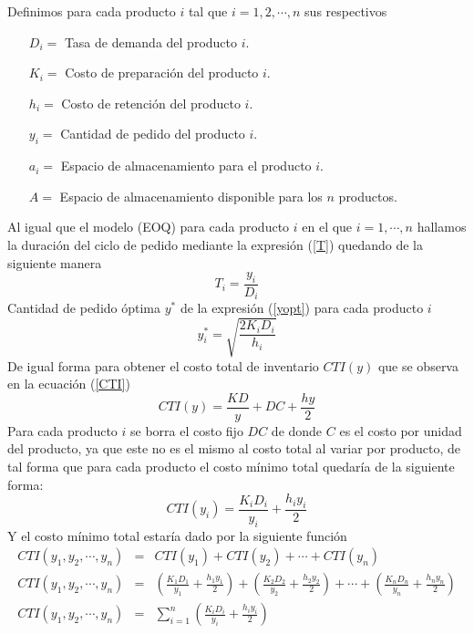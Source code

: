 Definimos para cada producto $i$ tal que $i = 1, 2, \cdots , n$ sus respectivos
\begin{itemize}
	\item[$D_i=$] Tasa de demanda del producto $i$.
	\item[$K_i=$] Costo de preparación del producto $i$.
	\item[$h_i=$] Costo de retención del producto $i$.
	\item[$y_i=$] Cantidad de pedido del producto $i$.
	\item[$a_i=$] Espacio de almacenamiento para el producto $i$.
	\item[$A=$] Espacio de almacenamiento disponible para los $n$ productos.
\end{itemize}
Al igual que el modelo (EOQ) para cada producto $i$ en el que $i = 1, \cdots, n$ hallamos la duración del ciclo de pedido mediante la expresión (\ref{T}) quedando de la siguiente manera
\begin{equation}
	\label{T_i}
	{T}_{i} = \frac{y_i}{D_i}
\end{equation}
Cantidad de pedido óptima $y^*$ de la expresión (\ref{yopt}) para cada producto $i$
\begin{equation}
	\label{yiast}
	{y}_{i}^{*} = \sqrt{\frac{2{K}_{i}{D}_{i}}{{h}_{i}}}
\end{equation}
De igual forma para obtener el costo total de inventario $CTI(y)$ que se observa en la ecuación (\ref{CTI})
$$
CTI(y) = \frac{KD}{y} + DC + \frac{hy}{2}
$$
Para cada producto $i$ se borra el costo fijo $DC$ de donde $C$ es el costo por unidad del producto, ya que este no es el mismo al costo total al variar por producto, de tal forma que para cada producto el costo mínimo total quedaría de la siguiente forma:
\begin{equation}
	\label{CTI_i_opt}
	CTI({y}_{i}) = \frac{{K}_{i}{D}_{i}}{{y}_{i}} + \frac{{h}_{i}{y}_{i}}{2} 	
\end{equation} 
Y el costo mínimo total estaría dado por la siguiente función
\begin{eqnarray}
	CTI({y}_{1},{y}_{2},\cdots , {y}_{n}) &=& CTI({y}_{1}) + CTI({y}_{2}) + \cdots + CTI({y}_{n}) \nonumber \\
	 CTI({y}_{1},{y}_{2},\cdots , {y}_{n}) &=& \left(\frac{{K}_{1}{D}_{1}}{{y}_{1}} + \frac{{h}_{1}{y}_{1}}{2} 	 \right) + \left(\frac{{K}_{2}{D}_{2}}{{y}_{2}} + \frac{{h}_{2}{y}_{2}}{2} 	 \right) + \cdots + \left(\frac{{K}_{n}{D}_{n}}{{y}_{n}} + \frac{{h}_{n}{y}_{n}}{2} 	 \right) \nonumber \\
	 CTI({y}_{1},{y}_{2},\cdots , {y}_{n}) &=& \sum\limits_{i = 1}^{n} \left(\frac{{K}_{i}{D}_{i}}{{y}_{i}} + \frac{{h}_{i}{y}_{i}}{2} \right)
\end{eqnarray}
